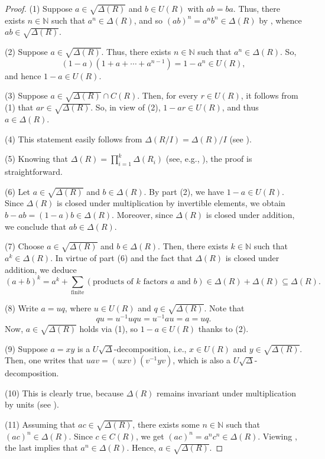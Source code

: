 \documentclass[11pt]{amsart}
\theoremstyle{definition}
\begin{document}
\begin{proof}
(1) Suppose \( a \in \sqrt{\Delta(R)} \) and $b\in U(R)$ with \( ab=ba \). Thus, there exists \( n \in \mathbb{N} \) such that \( a^n \in \Delta(R) \), and so \( (ab)^n = a^nb^n \in \Delta(R) \) by \cite[Lemma 1(2)]{2}, whence \( ab \in \sqrt{\Delta(R)} \).

(2) Suppose \( a \in \sqrt{\Delta(R)} \). Thus, there exists \( n \in \mathbb{N} \) such that \( a^n \in \Delta(R) \). So, \[ (1-a)(1+a+ \cdots + a^{n-1}) = 1-a^n \in U(R) ,\] and hence \( 1-a \in U(R) \).

(3) Suppose \( a \in \sqrt{\Delta(R)} \cap C(R) \). Then, for every \( r \in U(R) \), it follows from (1) that \( ar \in \sqrt{\Delta(R)} \). So, in view of (2), \( 1-ar \in U(R) \), and thus \( a \in \Delta(R) \).

(4) This statement easily follows from $\Delta(R/I)=\Delta(R)/I$ (see \cite[Proposition 6(3)]{2}).

(5) Knowing that \( \Delta(R) = \prod_{i=1}^k \Delta(R_i) \) (see, e.g., \cite[Lemma 1(5)]{2}), the proof is straightforward.

(6) Let $a \in \sqrt{\Delta(R)}$ and $b \in \Delta(R)$. By part (2), we have $1-a \in U(R)$. Since $\Delta(R)$ is closed under multiplication by invertible elements, we obtain $b-ab=(1-a)b \in \Delta(R)$. Moreover, since $\Delta(R)$ is closed under addition, we conclude that $ab \in \Delta(R)$.

(7) Choose $a \in \sqrt{\Delta(R)}$ and $b \in \Delta(R)$. Then, there exists $k \in \mathbb{N}$ such that $a^k \in \Delta(R)$. In virtue of part (6) and the fact that $\Delta(R)$ is closed under addition, we deduce
\[
(a+b)^k = a^k + \sum_{\text{finite}} (\text{products of } k \text{ factors } a \text{ and } b) \in \Delta(R) + \Delta(R) \subseteq \Delta(R).
\]

(8) Write $a=uq$, where $u\in U(R)$ and $q\in \sqrt{\Delta(R)}$. Note that \[ qu = u^{-1}uqu = u^{-1}au  = a = uq .\] Now, $a\in \sqrt{\Delta(R)}$ holds via (1), so $1-a\in U(R)$ thanks to (2).

(9) Suppose $a = xy$ is a $U\sqrt{\Delta}$-decomposition, i.e., $x \in U(R)$ and $y \in \sqrt{\Delta(R)}$. Then, one writes that $uav = (uxv)(v^{-1}yv)$, which is also a $U\sqrt{\Delta}$-decomposition.

(10) This is clearly true, because $\Delta(R)$ remains invariant under multiplication by units (see \cite[Lemma 1(2)]{2}).

(11) Assuming that $ac\in \sqrt{\Delta(R)}$, there exists some $n\in \mathbb{N}$ such that $(ac)^n\in \Delta(R)$.
Since $c\in C(R)$, we get $(ac)^n=a^nc^n \in \Delta(R)$. Viewing \cite[Lemma 1(2)]{2}, the last implies that $a^n\in \Delta(R)$. Hence, $a\in \sqrt{\Delta(R)}$.
\end{proof}
\end{document}
